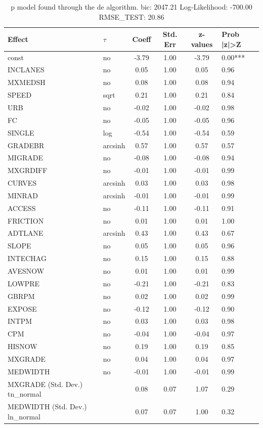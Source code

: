 \begin{table}
	\caption{p model found through the de algorithm. bic: 2047.21 Log-Likelihood: -700.00 RMSE_TEST: 20.86}
	\begin{center}
		\begin{tabular}{|l|l|c|c|c|l|}
			\hline
			Effect & $\tau$ & Coeff & Std. Err & z-values & Prob |z|>Z \\
			\hline
			const & no & -3.79 & 1.00 & -3.79 & 0.00*** \\
			\hline
			INCLANES & no & 0.05 & 1.00 & 0.05 & 0.96 \\
			\hline
			MXMEDSH & no & 0.08 & 1.00 & 0.08 & 0.94 \\
			\hline
			SPEED & sqrt & 0.21 & 1.00 & 0.21 & 0.84 \\
			\hline
			URB & no & -0.02 & 1.00 & -0.02 & 0.98 \\
			\hline
			FC & no & -0.05 & 1.00 & -0.05 & 0.96 \\
			\hline
			SINGLE & log & -0.54 & 1.00 & -0.54 & 0.59 \\
			\hline
			GRADEBR & arcsinh & 0.57 & 1.00 & 0.57 & 0.57 \\
			\hline
			MIGRADE & no & -0.08 & 1.00 & -0.08 & 0.94 \\
			\hline
			MXGRDIFF & no & -0.01 & 1.00 & -0.01 & 0.99 \\
			\hline
			CURVES & arcsinh & 0.03 & 1.00 & 0.03 & 0.98 \\
			\hline
			MINRAD & arcsinh & -0.01 & 1.00 & -0.01 & 0.99 \\
			\hline
			ACCESS & no & -0.11 & 1.00 & -0.11 & 0.91 \\
			\hline
			FRICTION & no & 0.01 & 1.00 & 0.01 & 1.00 \\
			\hline
			ADTLANE & arcsinh & 0.43 & 1.00 & 0.43 & 0.67 \\
			\hline
			SLOPE & no & 0.05 & 1.00 & 0.05 & 0.96 \\
			\hline
			INTECHAG & no & 0.15 & 1.00 & 0.15 & 0.88 \\
			\hline
			AVESNOW & no & 0.01 & 1.00 & 0.01 & 0.99 \\
			\hline
			LOWPRE & no & -0.21 & 1.00 & -0.21 & 0.83 \\
			\hline
			GBRPM & no & 0.02 & 1.00 & 0.02 & 0.99 \\
			\hline
			EXPOSE & no & -0.12 & 1.00 & -0.12 & 0.90 \\
			\hline
			INTPM & no & 0.03 & 1.00 & 0.03 & 0.98 \\
			\hline
			CPM & no & -0.04 & 1.00 & -0.04 & 0.97 \\
			\hline
			HISNOW & no & 0.19 & 1.00 & 0.19 & 0.85 \\
			\hline
			MXGRADE & no & 0.04 & 1.00 & 0.04 & 0.97 \\
			\hline
			MEDWIDTH & no & -0.01 & 1.00 & -0.01 & 0.99 \\
			\hline
			MXGRADE (Std. Dev.) tn_normal &  & 0.08 & 0.07 & 1.07 & 0.29 \\
			\hline
			MEDWIDTH (Std. Dev.) ln_normal &  & 0.07 & 0.07 & 1.00 & 0.32 \\
			\hline
		\end{tabular}
	\end{center}
\end{table}